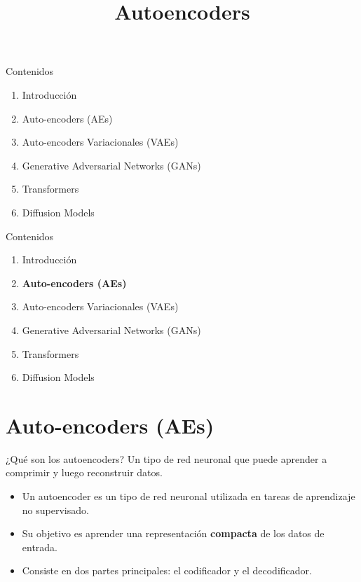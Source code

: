 



\title{Autoencoders}


\maketitle


\begin{frame}{Contenidos}
  \begin{enumerate}
      \item Introducción
      \item Auto-encoders (AEs)
      \item{Auto-encoders Variacionales (VAEs)}
      \item{Generative Adversarial Networks (GANs)}
      \item{Transformers}
      \item{Diffusion Models}
    \end{enumerate}
\end{frame}


\begin{frame}{Contenidos}
  \begin{enumerate}
      \item Introducción
      \item \textbf{Auto-encoders (AEs)}
      \item{Auto-encoders Variacionales (VAEs)}
      \item{Generative Adversarial Networks (GANs)}
      \item{Transformers}
      \item{Diffusion Models}
    \end{enumerate}
\end{frame}

\section{Auto-encoders (AEs)}

\begin{frame}{¿Qué son los autoencoders?}
Un tipo de red neuronal que puede aprender a comprimir y luego reconstruir datos.

\begin{itemize}
    \item Un autoencoder es un tipo de red neuronal utilizada en tareas de aprendizaje no supervisado.
    \item Su objetivo es aprender una representación \textbf{compacta} de los datos de entrada.
    \item Consiste en dos partes principales: el codificador y el decodificador.
  \end{itemize}
\end{frame}

